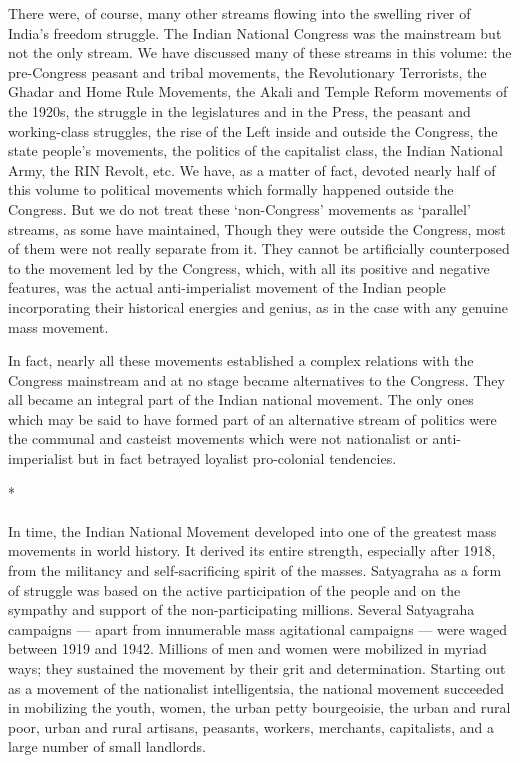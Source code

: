 There were, of course, many other streams flowing into the swelling river of India's freedom struggle. The Indian National Congress was the mainstream but not the only stream. We have discussed many of these streams in this volume: the pre-Congress peasant and tribal movements, the Revolutionary Terrorists, the Ghadar and Home Rule Movements, the Akali and Temple Reform movements of the 1920s, the struggle in the legislatures and in the Press, the peasant and working-class struggles, the rise of the Left inside and outside the Congress, the state people's movements, the politics of the capitalist class, the Indian National Army, the RIN Revolt, etc. We have, as a matter of fact, devoted nearly half of this volume to political movements which formally happened outside the Congress. But we do not treat these `non-Congress' movements as `parallel' streams, as some have maintained, Though they were outside the Congress, most of them were not really separate from it. They cannot be artificially counterposed to the movement led by the Congress, which, with all its positive and negative features, was the actual anti-imperialist movement of the Indian people incorporating their historical energies and genius, as in the case with any genuine mass movement.

In fact, nearly all these movements established a complex relations with the Congress mainstream and at no stage became alternatives to the Congress. They all became an integral part of the Indian national movement. The only ones which may be said to have formed part of an alternative stream of politics were the communal and casteist movements which were not nationalist or anti-imperialist but in fact betrayed loyalist pro-colonial tendencies.

\begin{center}*\end{center}

\paragraph*{}
In time, the Indian National Movement developed into one of the greatest mass movements in world history. It derived its entire strength, especially after 1918, from the militancy and self-sacrificing spirit of the masses. Satyagraha as a form of struggle was based on the active participation of the people and on the sympathy and support of the non-participating millions. Several Satyagraha campaigns --- apart from innumerable mass agitational campaigns --- were waged between 1919 and 1942. Millions of men and women were mobilized in myriad ways; they sustained the movement by their grit and determination. Starting out as a movement of the nationalist intelligentsia, the national movement succeeded in mobilizing the youth, women, the urban petty bourgeoisie, the urban and rural poor, urban and rural artisans, peasants, workers, merchants, capitalists, and a large number of small landlords.

